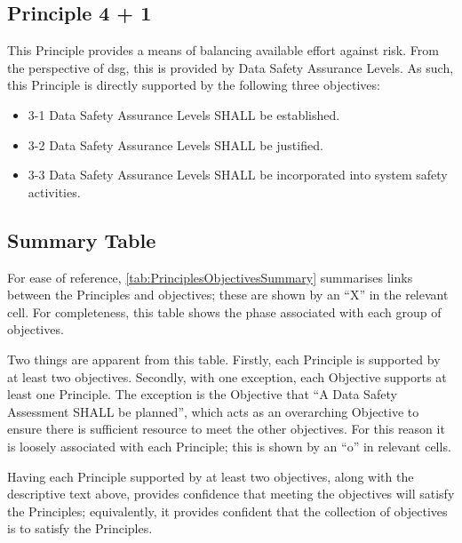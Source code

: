 \subsection{Principle 4 + 1}

This Principle provides a means of balancing available effort against risk. From the perspective of \gls{dsg}, this is provided by Data Safety Assurance Levels. As such, this Principle is directly supported by the following three objectives:

\begin{itemize}
	\item \textcolor{dsiwgAccentColour}{3-1} Data Safety Assurance Levels SHALL be established.
	\item \textcolor{dsiwgAccentColour}{3-2} Data Safety Assurance Levels SHALL be justified.
	\item \textcolor{dsiwgAccentColour}{3-3} Data Safety Assurance Levels SHALL be incorporated into system safety activities.
\end{itemize}


\subsection{Summary Table}

For ease of reference, \autoref{tab:PrinciplesObjectivesSummary} summarises links between the Principles and objectives; these are shown by an ``X'' in the relevant cell. For completeness, this table shows the phase associated with each group of objectives. 

Two things are apparent from this table. Firstly, each Principle is supported by at least two objectives. Secondly, with one exception, each Objective supports at least one Principle. The exception is the Objective that ``A Data Safety Assessment SHALL be planned'', which acts as an overarching Objective to ensure there is sufficient resource to meet the other objectives. For this reason it is loosely associated with each Principle; this is shown by an ``o'' in relevant cells.

Having each Principle supported by at least two objectives, along with the descriptive text above, provides confidence that meeting the objectives will satisfy the Principles; equivalently, it provides confident that the collection of objectives is  to satisfy the Principles. 

